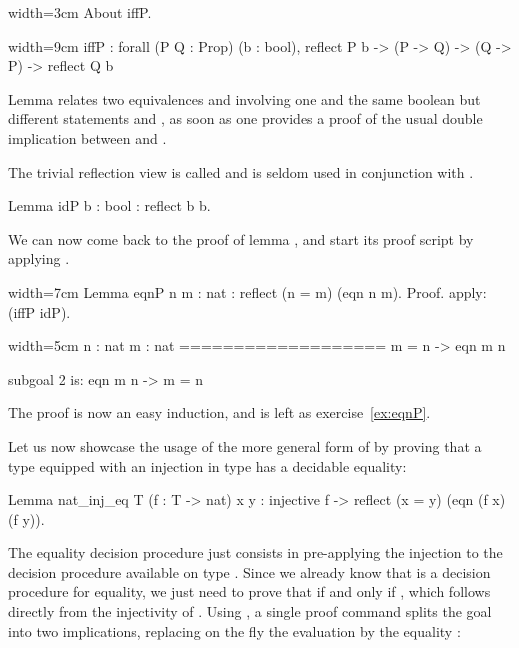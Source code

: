 \begin{coq}{}{width=3cm}
About iffP.
\end{coq}
\begin{coqout}{}{width=9cm}
iffP : forall (P Q : Prop) (b : bool),
  reflect P b -> (P -> Q) -> (Q -> P) -> reflect Q b
\end{coqout}
Lemma  relates two equivalences 
and  involving one and the same boolean 
but different  statements  and , as soon as one
provides a proof of the usual double implication between  and
.

The trivial reflection view is called  and is seldom used
in conjunction with .

\begin{coq}{}{}
Lemma idP {b : bool} : reflect b b.
\end{coq}
We can now come back to the proof of lemma , and start its
proof script by applying .

\begin{coq}{}{width=7cm}
Lemma eqnP {n m : nat} :
  reflect (n = m) (eqn n m).
Proof.
apply: (iffP idP).
\end{coq}
\begin{coqout}{}{width=5cm}
n : nat
m : nat
===================
 m = n -> eqn m n

subgoal 2 is:
 eqn m n -> m = n
\end{coqout}
The proof is now an easy induction, and is left as exercise~\ref{ex:eqnP}.

Let us now
showcase the usage of the more general form of  by proving
that a type equipped with an injection in type  has a
decidable equality:

\begin{coq}{}{}
Lemma nat_inj_eq T (f : T -> nat) x y :
  injective f -> reflect (x = y) (eqn (f x) (f y)).
\end{coq}
The equality decision procedure just consists in pre-applying
the injection  to the decision procedure  available on
type . Since we already know that  is a decision
procedure for equality, we just need to prove that  if and
only if , which  follows directly from the injectivity of
. Using , a single proof command splits the goal into two
implications, replacing on the fly the evaluation
 by the  equality :

